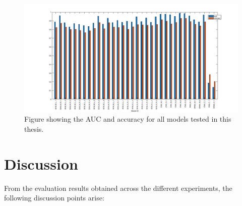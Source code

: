 \begin{figure}[ht]
  \centering
  \includegraphics[width=\textwidth]{figures/all_bar.png}
  \caption{Figure showing the AUC and accuracy for all models tested in this
  thesis.}\label{fig:all_bar}
\end{figure}

\section{Discussion}

From the evaluation results obtained across the different experiments, the
following discussion points arise:

